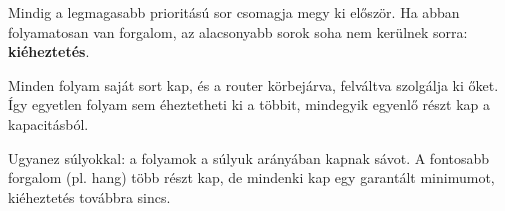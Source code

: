 Mindig a legmagasabb prioritású sor csomagja megy ki először. Ha abban folyamatosan van forgalom, az alacsonyabb sorok soha nem kerülnek sorra: \textbf{kiéheztetés}.

Minden folyam saját sort kap, és a router körbejárva, felváltva szolgálja ki őket. Így egyetlen folyam sem éheztetheti ki a többit, mindegyik egyenlő részt kap a kapacitásból.

Ugyanez súlyokkal: a folyamok a súlyuk arányában kapnak sávot. A fontosabb forgalom (pl. hang) több részt kap, de mindenki kap egy garantált minimumot, kiéheztetés továbbra sincs.
\begin{eredmeny}

\begin{center}\end{center}
\end{eredmeny}
